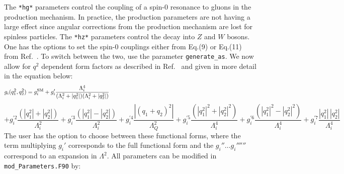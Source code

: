 \documentclass[aps,superscriptaddress,nofootinbib]{revtex4}
\begin{document}
\noindent
The \verb|*hg*| parameters control the coupling of a spin-0 resonance to gluons in the production mechanism.  
In practice, the production parameters are not having a large effect since angular corrections from the production mechanism are lost for spinless particles.  
The \verb|*hz*| parameters control the decay into $Z$ and $W$ bosons.  
One has the options to set the spin-0 couplings either from Eq.(9) or Eq.(11) from Ref.~\cite{Bolognesi:2012}.  
To switch between the two, use the parameter \verb|generate_as|.  
We now allow for $q^2$ dependent form factors as described in Ref.~\cite{Anderson:2013} and given in more detail in the equation below:
\[
g_i(q_1^2,q_2^2) = 
g_i^{\rm SM} 
+ g_i' \frac{\Lambda_i^4}{(\Lambda_i^2 + |q_1^2|)(\Lambda_i^2 + |q_2^2|)} 
~~~~~~~~~~~~~~~~~~~~~~~~~~~~~~~~~~~~~~~~~~~~~~~~~~~~~~~~~~~~~~~~~~~~~~~~~~~~~~
\]
\[
+ g_i^{\prime 2}  \frac{(|q_1^2|+|q_2^2|)}{\Lambda_i^2}
+ g_i^{\prime 3}  \frac{(|q_1^2|-|q_2^2|)}{\Lambda_i^2}
+ g_i^{\prime 4}  \frac{|(q_1+q_2)^2|}{\Lambda_Q^2}
+ g_i^{\prime 5}  \frac{(|q_1^2|^2+|q_2^2|^2)}{\Lambda_i^4}
+ g_i^{\prime 6}  \frac{(|q_1^2|^2-|q_2^2|^2)}{\Lambda_i^4}
+ g_i^{\prime 7}  \frac{|q_1^2| \, |q_2^2|}{\Lambda_i^4}
\]
\noindent
The user has the option to choose between these functional forms, 
where the term multiplying $g_i'$ corresponds to the full functional form and the $g_i''... g_i'''''' $ correspond to an expansion in $\Lambda^2$.
All parameters can be modified in \verb|mod_Parameters.F90| by:
\end{document}
